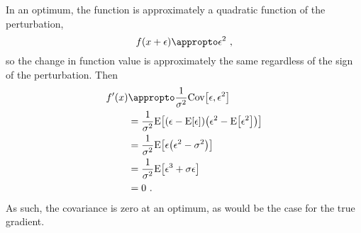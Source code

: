 In an optimum, the function is approximately a quadratic function of the perturbation,
\begin{equation*}
    f(x+\epsilon) \appropto \epsilon^2 \ ,
\end{equation*}
so the change in function value is approximately the same regardless of the sign of the perturbation. Then
\begin{align*}
    f'(x)
    &\appropto\frac{1}{\sigma^2 }\text{Cov}\bra{\epsilon, \epsilon^2}\\
    &=\frac{1}{\sigma^2}\text{E}\bra{\pa{\epsilon-\text{E}\bra{\epsilon}}\pa{\epsilon^2 - \text{E}\bra{\epsilon^2}}}\\
    &=\frac{1}{\sigma^2}\text{E}\bra{\epsilon\pa{\epsilon^2 - \sigma^2}}\\
    &=\frac{1}{\sigma^2}\text{E}\bra{\epsilon^3 + \sigma\epsilon}\\
    &=0 \ .
\end{align*}
As such, the covariance is zero at an optimum, as would be the case for the true gradient.

